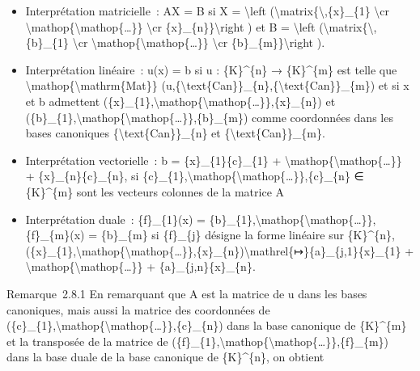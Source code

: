 \documentclass[]{article}
\begin{document}
\begin{itemize}
\itemsep1pt\parskip0pt
\item
  Interprétation matricielle~: AX = B si X = \textbackslash{}left
  (\textbackslash{}matrix\{\textbackslash{},\{x\}\_\{1\}
  \textbackslash{}cr
  \textbackslash{}mathop\{\textbackslash{}mathop\{\ldots{}\}\}
  \textbackslash{}cr \{x\}\_\{n\}\}\textbackslash{}right ) et B =
  \textbackslash{}left
  (\textbackslash{}matrix\{\textbackslash{},\{b\}\_\{1\}
  \textbackslash{}cr
  \textbackslash{}mathop\{\textbackslash{}mathop\{\ldots{}\}\}
  \textbackslash{}cr \{b\}\_\{m\}\}\textbackslash{}right ).
\item
  Interprétation linéaire~: u(x) = b si u : \{K\}\^{}\{n\} →
  \{K\}\^{}\{m\} est telle que
  \textbackslash{}mathop\{\textbackslash{}mathrm\{Mat\}\}
  (u,\{\textbackslash{}text\{Can\}\}\_\{n\},\{\textbackslash{}text\{Can\}\}\_\{m\})
  et si x et b admettent
  (\{x\}\_\{1\},\textbackslash{}mathop\{\textbackslash{}mathop\{\ldots{}\}\},\{x\}\_\{n\})
  et
  (\{b\}\_\{1\},\textbackslash{}mathop\{\textbackslash{}mathop\{\ldots{}\}\},\{b\}\_\{m\})
  comme coordonnées dans les bases canoniques
  \{\textbackslash{}text\{Can\}\}\_\{n\} et
  \{\textbackslash{}text\{Can\}\}\_\{m\}.
\item
  Interprétation vectorielle~: b = \{x\}\_\{1\}\{c\}\_\{1\} +
  \textbackslash{}mathop\{\textbackslash{}mathop\{\ldots{}\}\} +
  \{x\}\_\{n\}\{c\}\_\{n\}, si
  \{c\}\_\{1\},\textbackslash{}mathop\{\textbackslash{}mathop\{\ldots{}\}\},\{c\}\_\{n\}
  ∈ \{K\}\^{}\{m\} sont les vecteurs colonnes de la matrice A
\item
  Interprétation duale~: \{f\}\_\{1\}(x) =
  \{b\}\_\{1\},\textbackslash{}mathop\{\textbackslash{}mathop\{\ldots{}\}\},\{f\}\_\{m\}(x)
  = \{b\}\_\{m\} si \{f\}\_\{j\} désigne la forme linéaire sur
  \{K\}\^{}\{n\},
  (\{x\}\_\{1\},\textbackslash{}mathop\{\textbackslash{}mathop\{\ldots{}\}\},\{x\}\_\{n\})\textbackslash{}mathrel\{↦\}\{a\}\_\{j,1\}\{x\}\_\{1\}
  + \textbackslash{}mathop\{\textbackslash{}mathop\{\ldots{}\}\} +
  \{a\}\_\{j,n\}\{x\}\_\{n\}.
\end{itemize}

Remarque~2.8.1 En remarquant que A est la matrice de u dans les bases
canoniques, mais aussi la matrice des coordonnées de
(\{c\}\_\{1\},\textbackslash{}mathop\{\textbackslash{}mathop\{\ldots{}\}\},\{c\}\_\{n\})
dans la base canonique de \{K\}\^{}\{m\} et la transposée de la matrice
de
(\{f\}\_\{1\},\textbackslash{}mathop\{\textbackslash{}mathop\{\ldots{}\}\},\{f\}\_\{m\})
dans la base duale de la base canonique de \{K\}\^{}\{n\}, on obtient
\end{document}
